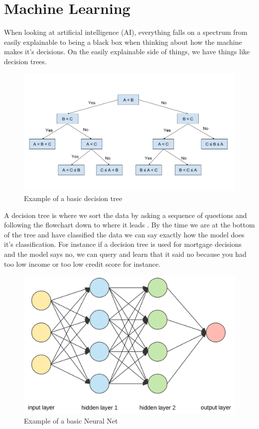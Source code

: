 \section{Machine Learning}

When looking at artificial intelligence (AI), everything falls on a spectrum from easily explainable to being a black box when thinking about how the machine makes it's decisions.
On the easily explainable side of things, we have things like decision trees.

\begin{figure}[H]
  \centering
  \includegraphics[width=120mm]{figures/decisionTree.png}
  \caption{Example of a basic decision tree\cite{Bansal_2021}}
  \label{decisionTree}
\end{figure}

A decision tree is where we sort the data by asking a sequence of questions and following the flowchart down to where it leads \cite{Wu_2007}.
By the time we are at the bottom of the tree and have classified the data we can say exactly how the model does it's classification.
For instance if a decision tree is used for mortgage decisions and the model says no, we can query and learn that it said no because you had too low income or too low credit score for instance.

\begin{figure}[H]
  \centering
  \includegraphics[width=120mm]{figures/neuralNet1.png}
  \caption{Example of a basic Neural Net \cite{Lelli_2019}}
  \label{neuralNet1}
\end{figure}

